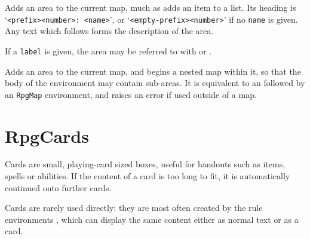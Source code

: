 			{
				Adds an area to the current map, much as  adds an item to a list. Its heading is `\texttt{<prefix><number>: <name>}', or `\texttt{<empty-prefix><number>}' if no \texttt{name} is given. Any text which follows forms the description of the area.

				If a \texttt{label} is given, the area may be referred to with  or .
			}
			{
				Adds an area to the current map, and begins a nested map within it, so that the body of the environment may contain sub-areas. It is equivalent to an  followed by an \texttt{RpgMap} environment, and raises an error if used outside of a map.

			}
	\section{RpgCards}\label{S:Card}

		Cards are small, playing-card sized boxes, useful for handouts such as items, spells or abilities. If the content of a card is too long to fit, it is automatically continued onto further cards.

		Cards are rarely used directly: they are most often created by the rule environments , which can display the same content either as normal text or as a card.


